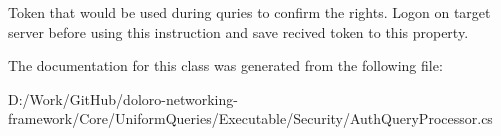 Token that would be used during quries to confirm the rights. Logon on target server before using this instruction and save recived token to this property. 



The documentation for this class was generated from the following file\+:\begin{DoxyCompactItemize}
\item 
D\+:/\+Work/\+Git\+Hub/doloro-\/networking-\/framework/\+Core/\+Uniform\+Queries/\+Executable/\+Security/Auth\+Query\+Processor.\+cs\end{DoxyCompactItemize}
